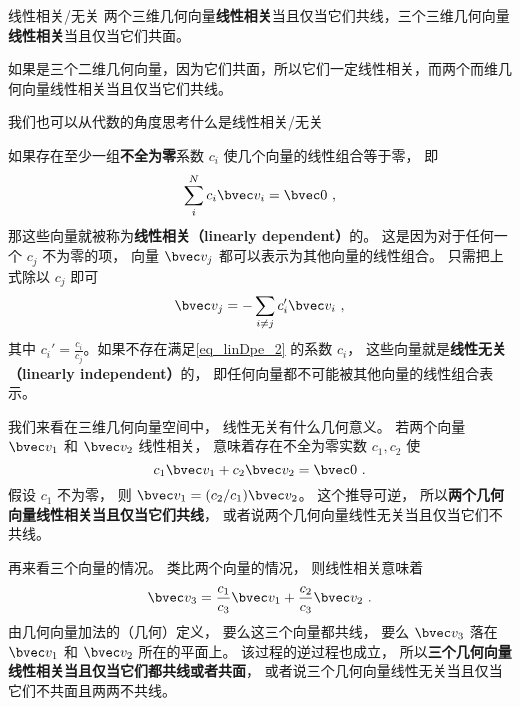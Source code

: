 
\begin{issues}
\issueDraft
\end{issues}


% 

\begin{definition}{线性相关/无关}\label{def_linDpe_1}
两个三维几何向量\textbf{线性相关}当且仅当它们共线，三个三维几何向量\textbf{线性相关}当且仅当它们共面。
\end{definition}



如果是三个二维几何向量，因为它们共面，所以它们一定线性相关，而两个而维几何向量线性相关当且仅当它们共线。


我们也可以从代数的角度思考什么是线性相关/无关

如果存在至少一组\textbf{不全为零}系数 $c_i$ 使几个向量的线性组合等于零， 即
\begin{equation}\label{eq_linDpe_2}
\sum_i^N c_i \bvec v_i = \bvec 0~,
\end{equation}
那这些向量就被称为\textbf{线性相关（linearly dependent）}的。 这是因为对于任何一个 $c_j$ 不为零的项， 向量 $\bvec v_j$ 都可以表示为其他向量的线性组合。 只需把上式除以 $c_j$ 即可
\begin{equation}\label{eq_linDpe_3}
\bvec v_j = -\sum_{i \ne j} c_i' \bvec v_i~,
\end{equation}
其中 $c_i' = \frac{c_i}{c_j}$。如果不存在满足\autoref{eq_linDpe_2} 的系数 $c_i$， 这些向量就是\textbf{线性无关（linearly independent）}的， 即任何向量都不可能被其他向量的线性组合表示。

\begin{example}{ }\label{ex_linDpe_1}
我们来看在三维几何向量空间中， 线性无关有什么几何意义。 若两个向量 $\bvec v_1$ 和 $\bvec v_2$ 线性相关， 意味着存在不全为零实数 $c_1, c_2$ 使
\begin{equation}
c_1 \bvec v_1 + c_2 \bvec v_2 = \bvec 0~.
\end{equation}
假设 $c_1$ 不为零， 则 $\bvec v_1 = (c_2 / c_1) \bvec v_2$。 这个推导可逆， 所以\textbf{两个几何向量线性相关当且仅当它们共线}， 或者说两个几何向量线性无关当且仅当它们不共线。

再来看三个向量的情况。 类比两个向量的情况， 则线性相关意味着
\begin{equation}
\bvec v_3 = \frac{c_1}{c_3} \bvec v_1 +  \frac{c_2}{c_3} \bvec v_2~.
\end{equation}
由几何向量加法的（几何）定义， 要么这三个向量都共线， 要么 $\bvec v_3$ 落在 $\bvec v_1$ 和 $\bvec v_2$ 所在的平面上。 该过程的逆过程也成立， 所以\textbf{三个几何向量线性相关当且仅当它们都共线或者共面}， 或者说三个几何向量线性无关当且仅当它们不共面且两两不共线。
\end{example}

